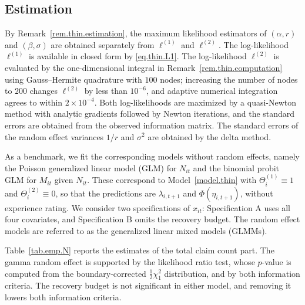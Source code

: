 \subsection{Estimation}
\label{sec.emp.estimation}

By Remark~\ref{rem.thin.estimation}, the maximum likelihood estimators
of \((\alpha,r)\) and \((\beta,\sigma)\) are obtained separately from
\(\ell^{(1)}\) and \(\ell^{(2)}\). The log-likelihood \(\ell^{(1)}\) is
available in closed form by \eqref{eq.thin.L1}. The log-likelihood
\(\ell^{(2)}\) is evaluated by the one-dimensional integral in
Remark~\ref{rem.thin.computation} using Gauss--Hermite quadrature with
\(100\) nodes; increasing the number of nodes to \(200\) changes
\(\ell^{(2)}\) by less than \(10^{-6}\), and adaptive numerical
integration agrees to within \(2\times10^{-4}\). Both log-likelihoods
are maximized by a quasi-Newton method with analytic gradients followed
by Newton iterations, and the standard errors are obtained from the
observed information matrix. The standard errors of the random effect
variances \(1/r\) and \(\sigma^2\) are obtained by the delta method.

As a benchmark, we fit the corresponding models without random effects,
namely the Poisson generalized linear model (GLM) for \(N_{it}\) and the
binomial probit GLM for \(M_{it}\) given \(N_{it}\). These correspond to
Model~\ref{model.thin} with \(\Theta_i^{(1)}\equiv1\) and
\(\Theta_i^{(2)}\equiv0\), so that the predictions are
\(\lambda_{i,t+1}\) and \(\Phi(\eta_{i,t+1})\), without experience
rating. We consider two specifications of \(x_{it}\): Specification A
uses all four covariates, and Specification B omits the recovery budget.
The random effect models are referred to as the generalized linear mixed
models (GLMMs).

Table~\ref{tab.emp.N} reports the estimates of the total claim count
part. The gamma random effect is supported by the likelihood ratio test,
whose \(p\)-value is computed from the boundary-corrected
\(\frac12\chi^2_1\) distribution, and by both information criteria. The
recovery budget is not significant in either model, and removing it
lowers both information criteria.

